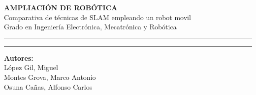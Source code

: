 \documentclass[a4paper,twoside]{article}
\begin{document}

\begin{titlepage}
\centering
\Huge{\textbf{AMPLIACIÓN DE ROBÓTICA}} \\
\Huge{Comparativa de técnicas de SLAM empleando un robot movil}\\

\vspace{1cm}
\LARGE{Grado en Ingeniería Electrónica, Mecatrónica y Robótica}\\
\rule{\textwidth}{0.1mm}
\large{\tableofcontents}
\vspace{1cm}
\rule{\textwidth}{0.1mm}
\Large{\textbf{Autores:} \\
                         López Gil, Miguel \\
                         Montes Grova, Marco Antonio\\
                         Osuna Cañas, Alfonso Carlos}
\end{titlepage}
\newpage

\end{document}
